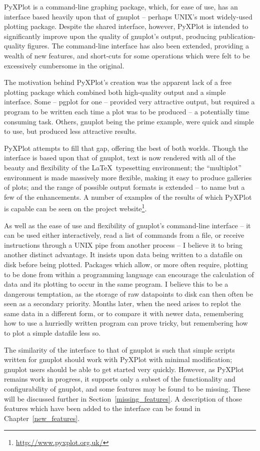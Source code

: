 \documentclass[a4paper,onecolumn,11pt]{book}
\begin{document}
PyXPlot is a command-line graphing package, which, for ease of use, has an
interface based heavily upon that of gnuplot -- perhaps UNIX's most widely-used
plotting package. Despite the shared interface, however, PyXPlot is intended to
significantly improve upon the quality of gnuplot's output, producing
publication-quality figures. The command-line interface has also been extended,
providing a wealth of new features, and short-cuts for some operations which
were felt to be excessively cumbersome in the original.

The motivation behind PyXPlot's creation was the apparent lack of a free
plotting package which combined both high-quality output and a simple
interface.  Some -- pgplot for one -- provided very attractive output, but
required a program to be written each time a plot was to be produced -- a
potentially time consuming task. Others, gnuplot being the prime example, were
quick and simple to use, but produced less attractive results.

PyXPlot attempts to fill that gap, offering the best of both worlds. Though the
interface is based upon that of gnuplot, text is now rendered with all of the
beauty and flexibility of the \LaTeX\ typesetting environment; the
``multiplot'' environment is made massively more flexible, making it easy to
produce galleries of plots; and the range of possible output formats is
extended -- to name but a few of the enhancements. A number of examples of the
results of which PyXPlot is capable can be seen on the project
website\footnote{\url{http://www.pyxplot.org.uk/}}.

As well as the ease of use and flexibility of gnuplot's command-line interface
-- it can be used either interactively, read a list of commands from a file, or
receive instructions through a UNIX pipe from another process -- I believe it
to bring another distinct advantage. It insists upon data being written to a
datafile on disk before being plotted. Packages which allow, or more often
require, plotting to be done from within a programming language can encourage
the calculation of data and its plotting to occur in the same program. I
believe this to be a dangerous temptation, as the storage of raw datapoints to
disk can then often be seen as a secondary priority. Months later, when the
need arises to replot the same data in a different form, or to compare it with
newer data, remembering how to use a hurriedly written program can prove
tricky, but remembering how to plot a simple datafile less so.

The similarity of the interface to that of gnuplot is such that simple scripts
written for gnuplot should work with PyXPlot with minimal modification; gnuplot
users should be able to get started very quickly.  However, as PyXPlot remains
work in progress, it supports only a subset of the functionality and
configurability of gnuplot, and some features may be found to be missing.
These will be discussed further in Section~\ref{missing_features}. A
description of those features which have been added to the interface can be
found in Chapter~\ref{new_features}.
\end{document}

